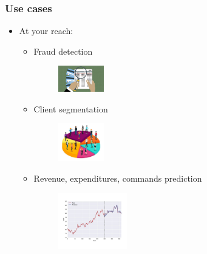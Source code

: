 \begin{frame}\frametitle{Use cases}
   \begin{itemize}
      \item At your reach:
      \vspace*{20px}
      \begin{itemize}
         \item Fraud detection
         \begin{minipage}{0.1\linewidth}
            \begin{figure}[H]
               \includegraphics[width=2cm]{../images/illustrations/fraud.jpeg}
            \end{figure}
         \end{minipage}
         \item Client segmentation
         \begin{minipage}{0.1\linewidth}
            \begin{figure}[H]
               \includegraphics[width=2cm]{../images/illustrations/client_segmentation.jpeg}
            \end{figure}
         \end{minipage}
         \item Revenue, expenditures, commands prediction
         \begin{minipage}{0.1\linewidth}
            \begin{figure}[H]
               \includegraphics[width=3cm]{../images/illustrations/time_series_pred.jpeg}
            \end{figure}
         \end{minipage}
      \end{itemize}
   \end{itemize}
\end{frame}


